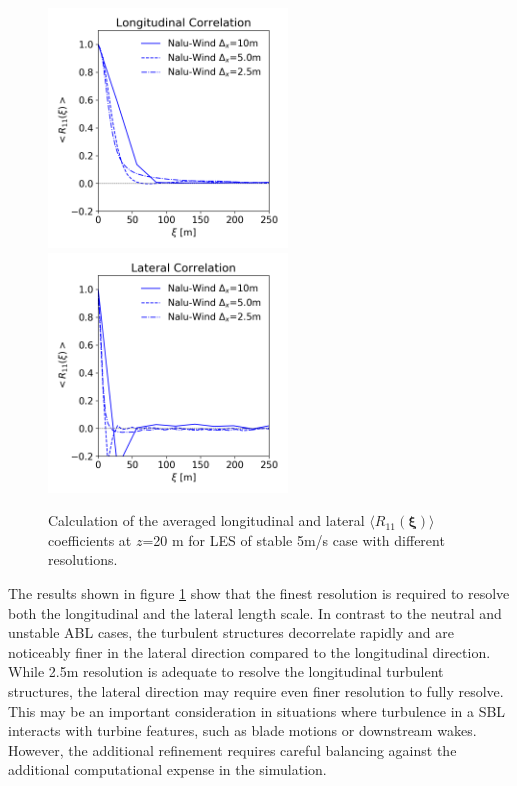 \begin{figure}%
  \centering
  \includegraphics[width=2.5in]{figures/GridStudy_Rij_Longitudinal.png}
  \includegraphics[width=2.5in]{figures/GridStudy_Rij_Lateral.png}
  \caption{\label{fig:GridStudyRij} Calculation of the averaged
    longitudinal and lateral $\langle R_{11}(\boldsymbol{\xi})
    \rangle$ coefficients at $z$=20 m for LES of stable 5m/s case with
    different resolutions.}
\end{figure}

The results shown in figure \ref{fig:GridStudyRij} show that the
finest resolution is required to resolve both the longitudinal and the
lateral length scale.  In contrast to the neutral and unstable ABL
cases, the turbulent structures decorrelate rapidly and are noticeably
finer in the lateral direction compared to the longitudinal direction.
While 2.5m resolution is adequate to resolve the longitudinal
turbulent structures, the lateral direction may require even finer
resolution to fully resolve.  This may be an important consideration
in situations where turbulence in a SBL interacts
with turbine features, such as blade motions or downstream wakes.
However, the additional refinement requires careful balancing against
the additional computational expense in the simulation.

